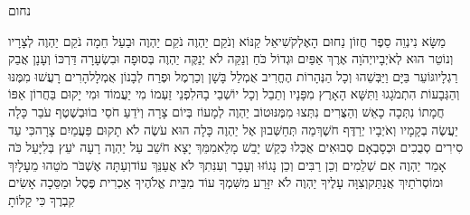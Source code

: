 \documentclass[../main/main.tex]{subfiles}
\begin{document}
\Incipit{}נחום\par
\vspace{\afterchapskip}
\RTLmulticolcolumns
\begin{multicols}{\ncols}
מַשָּׂא נִינְוֵה סֵפֶר חֲזוֹן נַחוּם הָאֶלְקֹשִׁי\PreVerseSpace{}אֵל קַנּוֹא וְנֹקֵם יַהְוֶה נֹקֵם יַהְוֶה וּבַעַל חֵמָה נֹקֵם יַהְוֶה לְצָרָיו וְנוֹטֵר הוּא לְאֹיְבָיו\PreVerseSpace{}יְהֹוָה אֶרֶךְ אַפַּיִם וּגְדוֹל כֹּחַ וְנַקֵּה לֹא יְנַקֶּה יַהְוֶה בְּסוּפָה וּבִשְׂעָרָה דַּרְכּוֹ וְעָנָן אֲבַק רַגְלָיו\PreVerseSpace{}גּוֹעֵר בַּיָּם וַיַּבְּשֵׁהוּ וְכָל הַנְּהָרוֹת הֶחֱרִיב אֻמְלַל בָּשָׁן וְכַרְמֶל וּפֶרַח לְבָנוֹן אֻמְלָל\PreVerseSpace{}הָרִים רָעֲשׁוּ מִמֶּנּוּ וְהַגְּבָעוֹת הִתְמֹגָגוּ וַתִּשָּׁא\SubEnd{} הָאָרֶץ מִפָּנָיו וְתֵבֵל וְכָל יוֹשְׁבֵי בָהּ\PreVerseSpace{}לִפְנֵי זַעְמוֹ מִי יַעֲמוֹד וּמִי יָקוּם בַּחֲרוֹן אַפּוֹ חֲמָתוֹ נִתְּכָה כָאֵשׁ וְהַצֻּרִים נִתְּצוּ מִמֶּנּוּ\PreVerseSpace{}טוֹב יַהְוֶה לְמָעוֹז בְּיוֹם צָרָה וְיֹדֵעַ חֹסֵי בוֹ\PreVerseSpace{}וּבְשֶׁטֶף עֹבֵר כָּלָה יַעֲשֶׂה בְקָמָיו\SubEnd{} וְאֹיְבָיו יְרַדֶּף חֹשֶׁךְ\PreVerseSpace{}מַה תְּחַשְּׁבוּן אֶל יַהְוֶה כָּלָה הוּא עֹשֶׂה לֹא תָקוּם פַּעֲמַיִם צָרָה\PreVerseSpace{}כִּי עַד סִירִים סְבֻכִים וּכְסָבְאָם סְבוּאִים אֻכְּלוּ כְּקַשׁ יָבֵשׁ מָלֵא\PreVerseSpace{}מִמֵּךְ יָצָא חֹשֵׁב עַל יַהְוֶה רָעָה יֹעֵץ בְּלִיָּעַל \ClosedSection{}כֹּה אָמַר יַהְוֶה אִם שְׁלֵמִים וְכֵן רַבִּים וְכֵן נָגוֹזּוּ וְעָבָר וְעִנִּתִךְ לֹא אֲעַנֵּךְ עוֹד\PreVerseSpace{}וְעַתָּה אֶשְׁבֹּר מֹטֵהוּ מֵעָלָיִךְ וּמוֹסְרֹתַיִךְ אֲנַתֵּק\PreVerseSpace{}וְצִוָּה עָלֶיךָ יַהְוֶה לֹא יִזָּרַע מִשִּׁמְךָ עוֹד מִבֵּית אֱלֹהֶיךָ אַכְרִית פֶּסֶל וּמַסֵּכָה אָשִׂים קִבְרֶךָ כִּי קַלּוֹתָ\OpenSection{}\par

\end{multicols}
\end{document}
